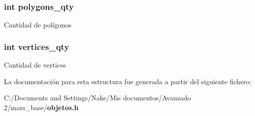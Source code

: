 \subsubsection[{polygons\_\-qty}]{\setlength{\rightskip}{0pt plus 5cm}int {\bf polygons\_\-qty}}\label{structt__model_a4f43c79d7e9b7e38af52be9386765d8e}
Cantidad de polígonos 
\subsubsection[{vertices\_\-qty}]{\setlength{\rightskip}{0pt plus 5cm}int {\bf vertices\_\-qty}}\label{structt__model_af45b6a3417c461d69a8af85781ca7080}
Cantidad de vertices 

La documentación para esta estructura fue generada a partir del siguiente fichero:\begin{DoxyCompactItemize}
\item 
C:/Documents and Settings/Nake/Mis documentos/Avanzado 2/mars\_\-base/{\bf objetos.h}\end{DoxyCompactItemize}
